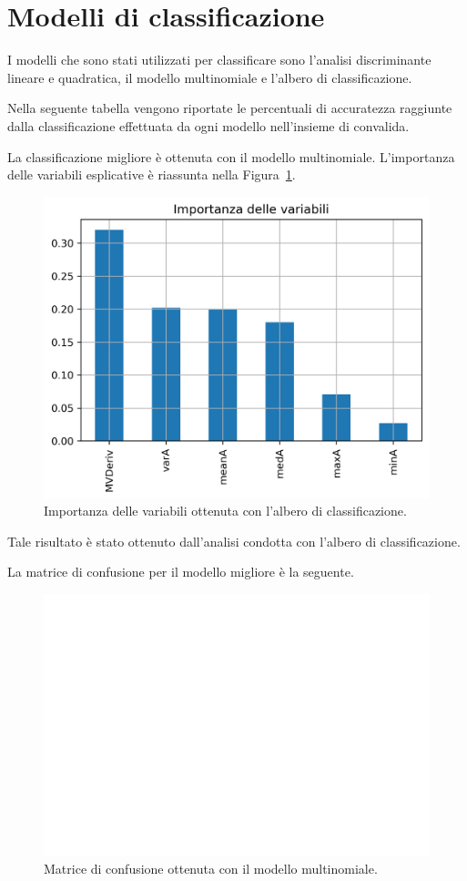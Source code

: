 \documentclass[main.tex]{subfiles}
\begin{document}
\section{Modelli di classificazione}
I modelli che sono stati utilizzati per classificare sono l'analisi discriminante lineare e quadratica, il modello multinomiale e l'albero di classificazione.

Nella seguente tabella vengono riportate le percentuali di accuratezza raggiunte dalla classificazione effettuata da ogni modello nell'insieme di convalida.


La classificazione migliore è ottenuta con il modello multinomiale. L'importanza delle variabili esplicative è riassunta nella Figura~\ref{fig:importance-Tree}.
\begin{figure}[H]
	\centering
	\includegraphics[width=.5\textwidth]{../../figure/importance-Tree.png}
	\caption{Importanza delle variabili ottenuta con l'albero di classificazione.}
	\label{fig:importance-Tree}
\end{figure}
Tale risultato è stato ottenuto dall'analisi condotta con l'albero di classificazione.

La matrice di confusione per il modello migliore è la seguente.
\begin{figure}[H]
	\centering
	\includegraphics[width=.5\textwidth]{../../figure/confusionMatrix-Mn.png}
	\caption{Matrice di confusione ottenuta con il modello multinomiale.}
	\label{fig:mn}
\end{figure}
\end{document}
